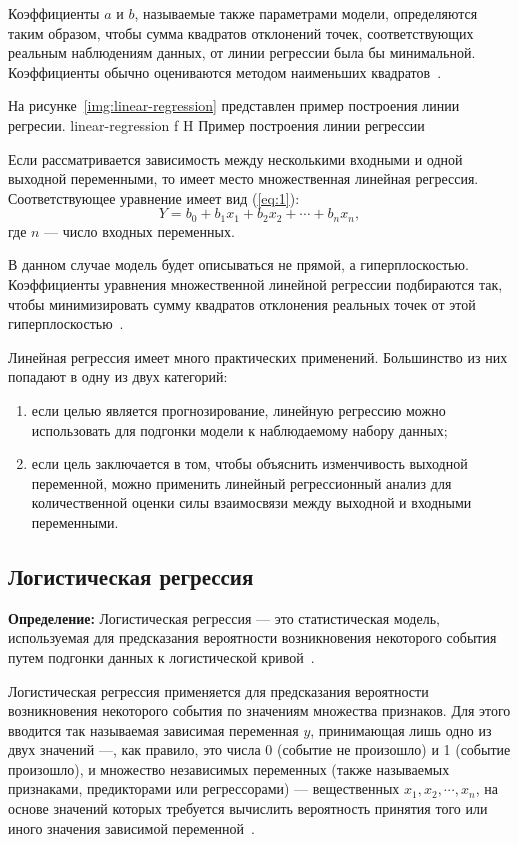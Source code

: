 Коэффициенты $a$ и $b$, называемые также параметрами модели, определяются таким образом, чтобы сумма квадратов отклонений точек, соответствующих реальным наблюдениям данных, от линии регрессии была бы минимальной.
Коэффициенты обычно оцениваются методом наименьших квадратов~\cite{loginom}.

На рисунке~\ref{img:linear-regression} представлен пример построения линии регресии.
{linear-regression}
{f}
{H}
{\textwidth}
{Пример построения линии регрессии}

Если рассматривается зависимость между несколькими входными и одной выходной переменными, то имеет место множественная линейная регрессия.
Соответствующее уравнение имеет вид (\ref{eq:1}):
\begin{equation}
    Y = b_0 + b_1 x_1 + b_2 x_2 + \cdots+ b_n x_n,
    \label{eq:1}
\end{equation}
где $n$ --- число входных переменных.

В данном случае модель будет описываться не прямой, а гиперплоскостью.
Коэффициенты уравнения множественной линейной регрессии подбираются так, чтобы минимизировать сумму квадратов отклонения реальных точек от этой гиперплоскостью~\cite{loginom}.

Линейная регрессия имеет много практических применений.
Большинство из них попадают в одну из двух категорий:
\begin{enumerate}[label=\arabic*), leftmargin=1.6\parindent]
    \item если целью является прогнозирование, линейную регрессию можно использовать для подгонки модели к наблюдаемому набору данных;
    \item если цель заключается в том, чтобы объяснить изменчивость выходной переменной, можно применить линейный регрессионный анализ для количественной оценки силы взаимосвязи между выходной и входными переменными.
\end{enumerate}

\subsection{Логистическая регрессия}

\textbf{ Определение:} Логистическая регрессия --- это статистическая модель, используемая для предсказания вероятности возникновения некоторого события путем подгонки данных к логистической кривой~\cite{kras}.

Логистическая регрессия применяется для предсказания вероятности возникновения некоторого события по значениям множества признаков.
Для этого вводится так называемая зависимая переменная $y$, принимающая лишь одно из двух значений ---, как правило, это числа 0 (событие не произошло) и 1 (событие произошло), и множество
независимых переменных (также называемых признаками, предикторами или регрессорами) --- вещественных $x_1, x_2, \cdots, x_n$, на основе значений которых требуется вычислить вероятность принятия того или иного значения зависимой переменной~\cite{kras}.

